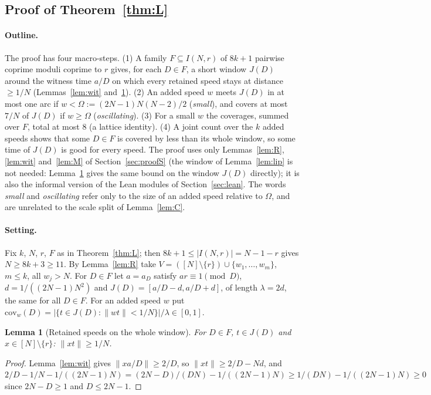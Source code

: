 \documentclass[11pt]{article}
\newtheorem{lemma}[theorem]{Lemma}
\theoremstyle{definition}
\theoremstyle{remark}
\newcommand{\nd}[1]{\lVert #1\rVert}
\begin{document}
\subsection{Proof of Theorem~\ref{thm:L}}\label{sec:proofL}
\paragraph{Outline.}
The proof has four macro-steps. (1) A family $F\subseteq I(N,r)$ of $8k+1$ pairwise coprime moduli coprime to $r$ gives, for each $D\in F$, a short window $J(D)$ around the witness time $a/D$ on which every retained speed stays at distance $\ge1/N$ (Lemmas~\ref{lem:wit} and~\ref{lem:L1}). (2) An added speed $w$ meets $J(D)$ in at most one arc if $w<\Omega:=(2N-1)N(N-2)/2$ (\emph{small}), and covers at most $7/N$ of $J(D)$ if $w\ge\Omega$ (\emph{oscillating}). (3) For a small $w$ the coverages, summed over $F$, total at most $8$ (a lattice identity). (4) A joint count over the $k$ added speeds shows that some $D\in F$ is covered by less than its whole window, so some time of $J(D)$ is good for every speed. The proof uses only Lemmas~\ref{lem:R}, \ref{lem:wit} and~\ref{lem:M} of Section~\ref{sec:proofS} (the window of Lemma~\ref{lem:lip} is not needed: Lemma~\ref{lem:L1} gives the same bound on the window $J(D)$ directly); it is also the informal version of the Lean modules of Section~\ref{sec:lean}. The words \emph{small} and \emph{oscillating} refer only to the size of an added speed relative to $\Omega$, and are unrelated to the scale split of Lemma~\ref{lem:C}.

\paragraph{Setting.}
Fix $k$, $N$, $r$, $F$ as in Theorem~\ref{thm:L}; then $8k+1\le|I(N,r)|=N-1-r$ gives $N\ge8k+3\ge11$. By Lemma~\ref{lem:R} take $V=([N]\setminus\{r\})\cup\{w_1,\dots,w_m\}$, $m\le k$, all $w_j>N$. For $D\in F$ let $a=a_D$ satisfy $ar\equiv1\pmod D$, $d=1/((2N-1)N^2)$ and $J(D)=[a/D-d,a/D+d]$, of length $\lambda=2d$, the same for all $D\in F$. For an added speed $w$ put $\mathrm{cov}_w(D)=|\{t\in J(D):\nd{wt}<1/N\}|/\lambda\in[0,1]$.

\begin{lemma}[Retained speeds on the whole window]\label{lem:L1}
For $D\in F$, $t\in J(D)$ and $x\in[N]\setminus\{r\}$: $\nd{xt}\ge1/N$.
\end{lemma}
\begin{proof}
Lemma~\ref{lem:wit} gives $\nd{xa/D}\ge2/D$, so $\nd{xt}\ge2/D-Nd$, and $2/D-1/N-1/((2N-1)N)=(2N-D)/(DN)-1/((2N-1)N)\ge1/(DN)-1/((2N-1)N)\ge0$ since $2N-D\ge1$ and $D\le2N-1$.
\end{proof}
\end{document}
